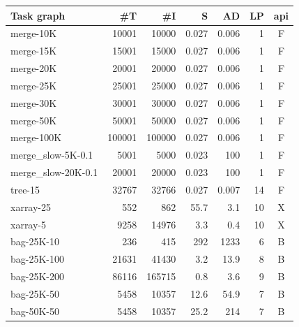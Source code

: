 \setlength{\tabcolsep}{5pt}
\begin{table}
	\centering
	\begin{tabular}{l|rrrrrc}
		\toprule
		\textbf{Task graph} & \textbf{\#T} & \textbf{\#I}       & \textbf{S} &
		\textbf{AD}         & \textbf{LP}  & \textbf{\gls{api}}                               \\
		\midrule
		merge-10K           & 10001        & 10000              & 0.027      & 0.006 & 1  & F \\
		merge-15K           & 15001        & 15000              & 0.027      & 0.006 & 1  & F \\
		merge-20K           & 20001        & 20000              & 0.027      & 0.006 & 1  & F \\
		merge-25K           & 25001        & 25000              & 0.027      & 0.006 & 1  & F \\
		merge-30K           & 30001        & 30000              & 0.027      & 0.006 & 1  & F \\
		merge-50K           & 50001        & 50000              & 0.027      & 0.006 & 1  & F \\
		merge-100K          & 100001       & 100000             & 0.027      & 0.006 & 1  & F \\
		merge\_slow-5K-0.1  & 5001         & 5000               & 0.023      & 100   & 1  & F \\
		merge\_slow-20K-0.1 & 20001        & 20000              & 0.023      & 100   & 1  & F \\
		tree-15             & 32767        & 32766              & 0.027      & 0.007 & 14 & F \\
		xarray-25           & 552          & 862                & 55.7       & 3.1   & 10 & X \\
		xarray-5            & 9258         & 14976              & 3.3        & 0.4   & 10 & X \\
		bag-25K-10          & 236          & 415                & 292        & 1233  & 6  & B \\
		bag-25K-100         & 21631        & 41430              & 3.2        & 13.9  & 8  & B \\
		bag-25K-200         & 86116        & 165715             & 0.8        & 3.6   & 9  & B \\
		bag-25K-50          & 5458         & 10357              & 12.6       & 54.9  & 7  & B \\
		bag-50K-50          & 5458         & 10357              & 25.2       & 214   & 7  & B \\

\end{tabular}
\end{table}

